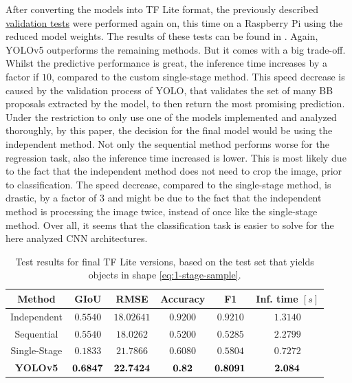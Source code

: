 After converting the models into TF Lite format, the previously described \hyperref[subsec:validation-of-trained-models]{validation tests} were performed again on, this time on a Raspberry Pi using the reduced model weights.
The results of these tests can be found in .
Again, YOLOv5 outperforms the remaining methods.
But it comes with a big trade-off.
Whilst the predictive performance is great, the inference time increases by a factor if $10$, compared to the custom single-stage method.
This speed decrease is caused by the validation process of YOLO, that validates the set of many BB proposals extracted by the model, to then return the most promising prediction.\\
Under the restriction to only use one of the models implemented and analyzed thoroughly, by this paper, the decision for the final model would be using the independent method.
Not only the sequential method performs worse for the regression task, also the inference time increased is lower.
This is most likely due to the fact that the independent method does not need to crop the image, prior to classification.
The speed decrease, compared to the single-stage method, is drastic, by a factor of $3$ and might be due to the fact that the independent method is processing the image twice, instead of once like the single-stage method.
Over all, it seems that the classification task is easier to solve for the here analyzed CNN architectures.
\begin{table}
    \centering
    \begin{tabular}{|c|c|c|c|c|c|}
    \hline
        \textbf{Method} & \textbf{GIoU} & \textbf{RMSE} & \textbf{Accuracy} & \textbf{F1} & \textbf{Inf. time $[s]$} \\
        \hline
        Independent & $0.5540$ &
$18.02641$ & $0.9200$ & $0.9210$ & $1.3140$\\
        \hline
        Sequential & $0.5540$ & $18.0262$ & $0.5200$ & $0.5285$ & $2.2799$\\
        \hline
        Single-Stage & $0.1833$
& $21.7866$ & $0.6080$ & $0.5804$ & $0.7272$\\
        \hline
        \hline
        \textbf{YOLOv5} & $\bm{0.6847}$ & $\bm{22.7424}$ & $\bm{0.82}$ & $\bm{0.8091}$ & $\bm{2.084}$\\
        \hline
    \end{tabular}
    \caption{Test results for final TF Lite versions, based on the test set that yields objects in shape \eqref{eq:1-stage-sample}.
    }
    \label{fig:final-results-tflite}
\end{table}

